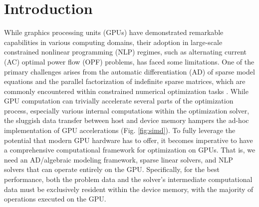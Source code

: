 \section{Introduction}

While graphics processing units (GPUs) have demonstrated remarkable
capabilities in various computing domains, their adoption in
large-scale constrained nonlinear programming (NLP) regimes, such as
alternating current (AC) optimal power flow (OPF) problems, has faced
some limitations. One of the primary challenges arises from the
automatic differentiation (AD) of sparse model equations and the
parallel factorization of indefinite sparse matrices, which are
commonly encountered within constrained numerical optimization tasks
\cite{anitescu2021targeting}. While GPU computation can trivially
accelerate several parts of the optimization process, especially
various internal computations within the optimization solver, the
sluggish data transfer between host and device memory hampers the
ad-hoc implementation of GPU accelerations (Fig. \ref{fig:simd}). To
fully leverage the potential that modern GPU hardware has to offer, it
becomes imperative to have a comprehensive computational framework for
optimization on GPUs. That is, we need an AD/algebraic
modeling framework, sparse linear solvers, and NLP solvers that can
operate entirely on the GPU. Specifically, for the best performance,
both the problem data and the solver's intermediate computational data
must be exclusively resident within the device memory, with the
majority of operations executed on the GPU.

